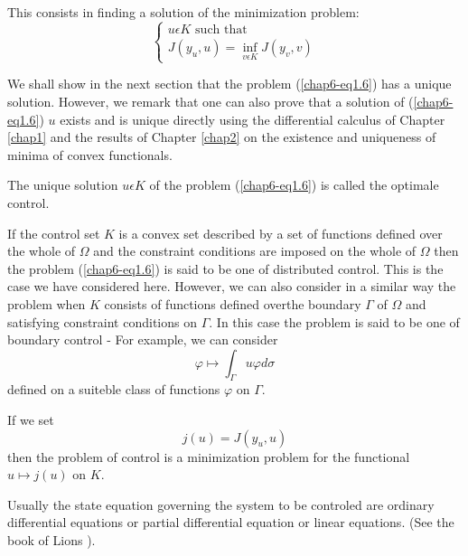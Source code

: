 \medskip
{} This consists in finding a solution of the minimization problem:
\begin{equation*}
\begin{cases}
u \epsilon K \text{ such that}\\
J(y_{u}, u) = \inf_{v \epsilon K} J(y_{v}, v)\tag{1.6}\label{chap6-eq1.6}
\end{cases}
\end{equation*}

We shall show in the next section that the problem (\ref{chap6-eq1.6})
has a unique solution. However, we remark that one can also prove that
a solution of (\ref{chap6-eq1.6}) $u$ exists and is unique directly
using the differential calculus of Chapter \ref{chap1} and the results
of Chapter \ref{chap2} on the existence and uniqueness of minima of
convex functionals. 

\begin{definition}\label{chap6-def1.1}
The unique solution $u \epsilon K$ of the problem (\ref{chap6-eq1.6}) is called the optimale control.
\end{definition}

\begin{remark}\label{chap6-rem1.1}
If the control set $K$ is a convex set described by a set of functions
defined over the whole of $\Omega$ and the constraint conditions are
imposed on the whole of $\Omega$ then the problem (\ref{chap6-eq1.6})
is said to be one of distributed control. This is the case we have
considered here. However, we can also consider in a similar way the
problem when $K$ consists of functions defined over\pageoriginale the
boundary $\Gamma$ of $\Omega$ and satisfying constraint conditions on
$\Gamma$. In this case the problem is said to be one of boundary
control - For example, we can consider 
$$
\varphi \mapsto \int_{\Gamma} u \varphi d \sigma
$$
defined on a suiteble class of functions $\varphi$ on $\Gamma$.
\end{remark}

\begin{remark}\label{chap6-rem1.2}
If we set
$$
j(u) = J(y_{u}, u)
$$
then the problem of control is a  minimization problem for the functional $u \mapsto j(u)$ on $K$.
\end{remark}

\begin{remark}\label{chap6-rem1.3}
Usually the state equation governing the system to be controled are
ordinary differential equations or partial differential equation or
linear equations. (See the book of Lions \cite{key31}). 
\end{remark}

